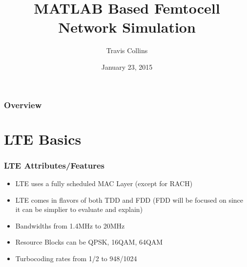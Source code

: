 \documentclass{beamer}
\title[Femtocell Simulations]{MATLAB Based Femtocell Network Simulation} %
\author{Travis Collins} %
\institute[WPI] %
{
Worcester Polyntechnic Institute \\ %
\medskip
\textit{traviscollins@wpi.edu} %
}
\date{January 23, 2015}
\begin{document}
\begin{frame}
\titlepage %
\end{frame}

\begin{frame}
\frametitle{Overview} %
\tableofcontents %
\end{frame}


\section{LTE Basics} %



\begin{frame}
  \frametitle{LTE Attributes/Features}
  \begin{itemize}
    \item LTE uses a fully scheduled MAC Layer (except for RACH)
    \item LTE comes in flavors of both TDD and FDD (FDD will be focused on since it can be simplier to evaluate and explain)
    \item Bandwidths from 1.4MHz to 20MHz
    \item Resource Blocks can be QPSK, 16QAM, 64QAM
    \item Turbocoding rates from 1/2 to 948/1024
  \end{itemize}
\end{frame}
\end{document}
